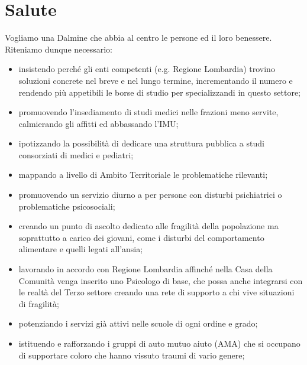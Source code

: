 \section{Salute}
Vogliamo una Dalmine che abbia al centro le persone ed il loro benessere. Riteniamo dunque necessario:

\begin{bluebox}
\begin{itemize}
  \item insistendo perché gli enti competenti (e.g. Regione Lombardia) trovino soluzioni concrete nel breve e nel lungo termine, incrementando il numero e rendendo più appetibili le borse di studio per specializzandi in questo settore;
  \item promuovendo l'insediamento di studi medici nelle frazioni meno servite, calmierando gli affitti ed abbassando l'IMU;
  \item ipotizzando la possibilità di dedicare una struttura pubblica a studi consorziati di medici e pediatri;
\end{itemize}
\end{bluebox}

\begin{bluebox}
\begin{itemize}
  \item mappando a livello di Ambito Territoriale le problematiche rilevanti;
  \item promuovendo un servizio diurno a per persone con disturbi psichiatrici o problematiche psicosociali;
  \item creando un punto di ascolto dedicato alle fragilità della popolazione ma soprattutto a carico dei giovani, come i disturbi del comportamento alimentare e quelli legati all'ansia;
  \item lavorando in accordo con Regione Lombardia affinché nella Casa della Comunità venga inserito uno Psicologo di base, che possa anche integrarsi con le realtà del Terzo settore creando una rete di supporto a chi vive situazioni di fragilità;
  \item potenziando i servizi già attivi nelle scuole di ogni ordine e grado;
  \item istituendo e rafforzando i gruppi di auto mutuo aiuto (AMA) che si occupano di supportare coloro che hanno vissuto traumi di vario genere;
\end{itemize}
\end{bluebox}

